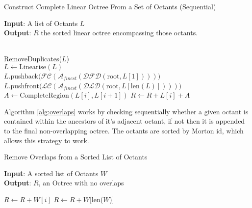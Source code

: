 \documentclass[12pt, a4, twoside]{article}
\begin{document}
\begin{algorithm}
    \caption{Construct Complete Linear Octree From a Set of Octants (Sequential)}\label{alg:complete}
    \hspace*{\algorithmicindent} \textbf{Input}: A list of Octants $L$ \\
    \hspace*{\algorithmicindent} \textbf{Output}: $R$ the sorted linear octree encompassing those octants.
    \begin{algorithmic}[1]
     \\

    RemoveDuplicates($L$)  \\

    $L \gets \text{Linearise}(L)$  \\
    $L$.pushback$(\mathcal{FC}$$(\mathcal{A}_{finest}(\mathcal{DFD}(\text{root}, L[1])) ))$ \\
    $L$.pushfront$(\mathcal{LC}$$(\mathcal{A}_{finest}(\mathcal{DLD}(\text{root}, L[\text{len}(L)])) ))$
        \State $A \gets \text{CompleteRegion}(L[i], L[i+1])$
        \State $R \gets R + L[i] + A$
    \EndFor
    \EndFunction
    \end{algorithmic}
 \end{algorithm}

 Algorithm \ref{alg:overlaps} works by checking sequentially whether a given octant is contained within the ancestors of it's adjacent octant, if not then it is appended to the final non-overlapping octree. The octants are sorted by Morton id, which allows this strategy to work.

 \begin{algorithm}
    \caption{Remove Overlaps from a Sorted List of Octants}\label{alg:overlaps}
    \hspace*{\algorithmicindent} \textbf{Input}: A sorted list of Octants $W$ \\
    \hspace*{\algorithmicindent} \textbf{Output}: $R$, an Octree with no overlaps
    \begin{algorithmic}[1]
            \State $R \gets R + W[i]$
        \EndIf
    \EndFor
        \State $R \gets R + W$[len($W$)]
    \EndFunction
    \end{algorithmic}
 \end{algorithm}
\end{document}

